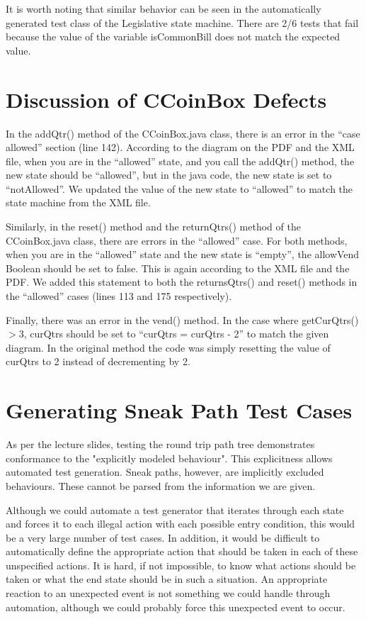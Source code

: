 \documentclass[11pt, a4paper]{article}
\begin{document}
It is worth noting that similar behavior can be seen in the automatically generated test class of the Legislative state machine. There are 2/6 tests that fail because the value of the variable isCommonBill does not match the expected value.

\section{Discussion of CCoinBox Defects}
In the addQtr() method of the CCoinBox.java class, there is an error in the “case allowed” section (line 142). According to the diagram on the PDF and the XML file, when you are in the “allowed” state, and you call the addQtr() method, the new state should be “allowed”, but in the java code, the new state is set to “notAllowed”. We updated the value of the new state to “allowed” to match the state machine from the XML file. 

Similarly, in the reset() method and the returnQtrs() method of the CCoinBox.java class, there are errors in the “allowed” case. For both methods, when you are in the “allowed” state and the new state is “empty”, the allowVend Boolean should be set to false. This is again according to the XML file and the PDF. We added this statement to both the returnsQtrs() and reset() methods in the “allowed” cases (lines 113 and 175 respectively). 

Finally, there was an error in the vend() method. In the case where getCurQtrs()$>$3, curQtrs should be set to “curQtrs = curQtrs - 2” to match the given diagram. In the original method the code was simply resetting the value of curQtrs to 2 instead of decrementing by 2.

\section{Generating Sneak Path Test Cases}
As per the lecture slides, testing the round trip path tree demonstrates conformance to the "explicitly modeled behaviour". This explicitness allows automated test generation. Sneak paths, however, are implicitly excluded behaviours. These cannot be parsed from the information we are given. 

Although we could automate a test generator that iterates through each state and forces it to each illegal action with each possible entry condition, this would be a very large number of test cases. In addition, it would be difficult to automatically define the appropriate action that should be taken in each of these unspecified actions. It is hard, if not impossible, to know what actions should be taken or what the end state should be in such a situation. An appropriate reaction to an unexpected event is not something we could handle through automation, although we could probably force this unexpected event to occur. 

\end{document}
